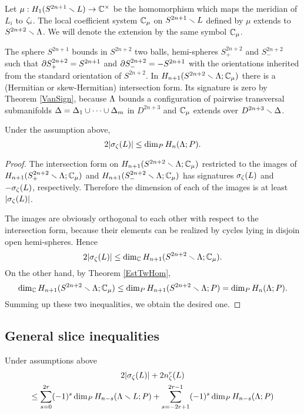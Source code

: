 \documentclass{article}
\numberwithin{equation}{section}
\begin{document}
Let $\mu:H_1(S^{2n+1}\smallsetminus L)\to\mathbb C^\times$ be the homomorphism which
maps the meridian of $L_i$ to $\zeta_i$. 
The local coefficient system $\mathbb C_\mu$ on $S^{2n+1}\smallsetminus L$ defined by
$\mu$  extends to $S^{2n+2}\smallsetminus\Lambda$. 
We will denote the extension by the same symbol $\mathbb C_\mu$.

The sphere $S^{2n+1}$ bounds in $S^{2n+2}$ two balls, hemi-spheres 
$S^{2n+2}_+$ and $S^{2n+2}_-$ such that $\partial S^{2n+2}_+=S^{2n+1}$ 
and $\partial S^{2n+2}_-=-S^{2n+1}$ with the orientations inherited
from the standard orientation of $S^{2n+2}$. In
$H_{n+1}(S^{2n+2}\smallsetminus\Lambda;\mathbb C_\mu)$ there is a (Hermitian or
skew-Hermitian) intersection form. Its signature is zero by Theorem
\ref{VanSign}, because $\Lambda$ bounds a configuration of pairwise 
transversal submanifolds $\Delta=\Delta_1\cup\dots\cup\Delta_m$ in $D^{2n+3}$ 
and $\mathbb C_\mu$ 
extends over $D^{2n+3}\smallsetminus\Delta$. 

\begin{Th}\label{slice-small-Th} Under the assumption above,
\begin{equation}\label{IneQSlice-easy}
2|\sigma_\zeta(L)|\le\dim_P H_n(\Lambda;P).
\end{equation}
\end{Th}

\begin{proof}
The intersection form on $H_{n+1}(S^{2n+2}\smallsetminus\Lambda;\mathbb C_\mu)$ restricted
to the images of $H_{n+1}(S^{2n+2}_+\smallsetminus\Lambda;\mathbb C_\mu)$ and  
$H_{n+1}(S^{2n+2}_-\smallsetminus\Lambda;\mathbb C_\mu)$ has signatures $\sigma_\zeta(L)$ and
$-\sigma_\zeta(L)$, respectively. Therefore the dimension of each of the images
is at least $|\sigma_\zeta(L)|$. 

The images are obviously orthogonal to each
other with respect to the intersection form, because their elements 
can be realized by cycles lying in disjoin open hemi-spheres.
Hence 
$$
2|\sigma_\zeta(L)|\le\dim_\mathbb C H_{n+1}(S^{2n+2}\smallsetminus\Lambda;\mathbb C_\mu).
$$
On the other hand, by Theorem \ref{EstTwHom}, 
$$\dim_\mathbb C H_{n+1}(S^{2n+2}\smallsetminus\Lambda;\mathbb C_\mu)\le 
\dim_P H_{n+1}(S^{2n+2}\smallsetminus\Lambda;P)=\dim_P H_n(\Lambda;P).$$ 
Summing up these two inequalities, we obtain the desired one.
\end{proof}

\subsection{General slice inequalities}\label{s5.2}
\begin{Th}\label{ThSlice}
Under assumptions above
\begin{multline}\label{IneQslice} 
2|\sigma_\zeta(L)| +2n^r_\zeta(L)\\
\le 
\sum_{s=0}^{2r}(-1)^s\dim_P H_{n-s}(\Lambda\smallsetminus L;P)
+\sum_{s=-2r+1}^{2r-1}(-1)^s\dim_P H_{n-s}(\Lambda;P)
\end{multline}
\end{Th}
\end{document}
